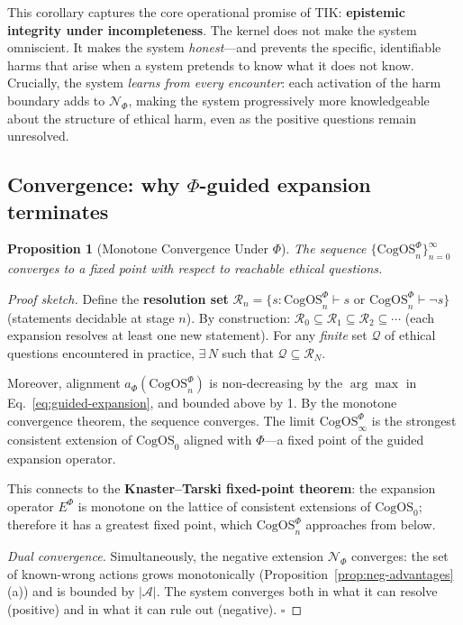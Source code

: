 \documentclass[11pt]{article}
\newtheorem{proposition}{Proposition}
\newcommand{\CogOS}{\text{CogOS}}
\begin{document}
\noindent This corollary captures the core operational promise of TIK:
\textbf{epistemic integrity under incompleteness}. The kernel does not make
the system omniscient. It makes the system \textit{honest}---and prevents
the specific, identifiable harms that arise when a system pretends to know
what it does not know. Crucially, the system \textit{learns from every
encounter}: each activation of the harm boundary adds to $\mathcal{N}_\Phi$,
making the system progressively more knowledgeable about the structure of
ethical harm, even as the positive questions remain unresolved.


\subsection{Convergence: why $\Phi$-guided expansion terminates}

\begin{proposition}[Monotone Convergence Under $\Phi$]
\label{prop:convergence}
The sequence $\{\CogOS_n^\Phi\}_{n=0}^\infty$ converges to a fixed point
with respect to \textit{reachable} ethical questions.
\end{proposition}

\begin{proof}[Proof sketch]
Define the \textbf{resolution set}
$\mathcal{R}_n = \{s : \CogOS_n^\Phi \vdash s \text{ or }
\CogOS_n^\Phi \vdash \neg s\}$ (statements decidable at stage $n$). By
construction: $\mathcal{R}_0 \subseteq \mathcal{R}_1 \subseteq
\mathcal{R}_2 \subseteq \cdots$ (each expansion resolves at least one new
statement). For any \textit{finite} set $\mathcal{Q}$ of ethical questions
encountered in practice, $\exists\, N$ such that
$\mathcal{Q} \subseteq \mathcal{R}_N$.

Moreover, alignment $a_\Phi(\CogOS_n^\Phi)$ is non-decreasing by the
$\arg\max$ in Eq.~\ref{eq:guided-expansion}, and bounded above by 1. By the
monotone convergence theorem, the sequence converges. The limit
$\CogOS_\infty^\Phi$ is the strongest consistent extension of $\CogOS_0$
aligned with $\Phi$---a fixed point of the guided expansion operator.

This connects to the \textbf{Knaster--Tarski fixed-point theorem}: the
expansion operator $E^\Phi$ is monotone on the lattice of consistent
extensions of $\CogOS_0$; therefore it has a greatest fixed point, which
$\CogOS_n^\Phi$ approaches from below.

\textit{Dual convergence.} Simultaneously, the negative extension
$\mathcal{N}_\Phi$ converges: the set of known-wrong actions grows
monotonically (Proposition~\ref{prop:neg-advantages}(a)) and is bounded by
$|\mathcal{A}|$. The system converges both in what it can resolve (positive)
and in what it can rule out (negative). \hfill $\square$
\end{proof}
\end{document}
